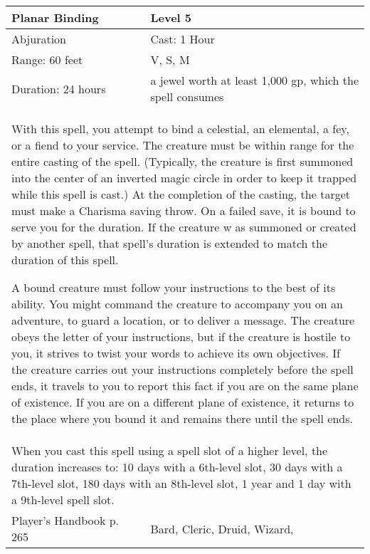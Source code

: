\documentclass[11pt]{report}
\begin{document}
\begin{table}[H]
	\begin{tabular}{||p{6cm}|p{6cm}||}
		\hline\hline
		\bf{Planar Binding} & Level 5\\ \hline
		Abjuration & Cast: 1 Hour\\ \hline
		Range: 60 feet & V, S, M\\ \hline
		Duration: 24 hours & a jewel worth at least 1,000 gp, which the spell consumes\\ \hline
		\multicolumn{2}{||p{12cm}||}{With this spell, you attempt to bind a celestial, an elemental, a fey, or a fiend to your service.
The creature must be within range for the entire casting of the spell. (Typically, the creature is first summoned into the center of an inverted magic circle in order to keep it trapped while this spell is cast.) At the completion of the casting, the target must make a Charisma saving throw. On a failed save, it is bound to serve you for the duration. If the creature w as summoned or created by another spell, that spell’s duration is extended to match the duration of this spell.

A bound creature must follow your instructions to the best of its ability. You might command the creature to accompany you on an adventure, to guard a location, or to deliver a message. The creature obeys the letter of your instructions, but if the creature is hostile to you, it strives to twist your words to achieve its own objectives. If the creature carries out your instructions completely before the spell ends, it travels to you to report this fact if you are on the same plane of existence. If you are on a different plane of existence, it returns to the place where you bound it and remains there until the spell ends.}\\ \hline
		\multicolumn{2}{||p{12cm}||}{When you cast this spell using a spell slot of a higher level, the duration increases to:
10 days with a 6th-level slot,
30 days with a 7th-level slot,
180 days with an 8th-level slot, 
1 year and 1 day with a 9th-level spell slot.}\\ \hline
Player's Handbook p. 265 & Bard, Cleric, Druid, Wizard, \\ \hline\hline
	\end{tabular}
\end{table}
\end{document}
